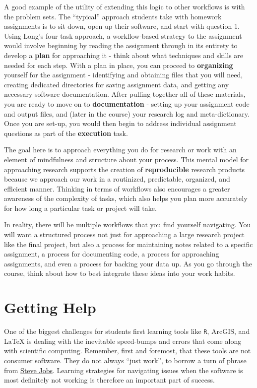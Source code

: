 \documentclass[]{book}
\theoremstyle{definition}
\theoremstyle{definition}
\theoremstyle{definition}
\theoremstyle{remark}
\begin{document}
A good example of the utility of extending this logic to other workflows
is with the problem sets. The ``typical'' approach students take with
homework assignments is to sit down, open up their software, and start
with question 1. Using Long's four task approach, a workflow-based
strategy to the assignment would involve beginning by reading the
assignment through in its entirety to develop a \textbf{plan} for
approaching it - think about what techniques and skills are needed for
each step. With a plan in place, you can proceed to \textbf{organizing}
yourself for the assignment - identifying and obtaining files that you
will need, creating dedicated directories for saving assignment data,
and getting any necessary software documentation. After pulling together
all of these materials, you are ready to move on to
\textbf{documentation} - setting up your assignment code and output
files, and (later in the course) your research log and meta-dictionary.
Once you are set-up, you would then begin to address individual
assignment questions as part of the \textbf{execution} task.

The goal here is to approach everything you do for research or work with
an element of mindfulness and structure about your process. This mental
model for approaching research supports the creation of
\textbf{reproducible} research products because we approach our work in
a routinized, predictable, organized, and efficient manner. Thinking in
terms of workflows also encourages a greater awareness of the complexity
of tasks, which also helps you plan more accurately for how long a
particular task or project will take.

In reality, there will be multiple workflows that you find yourself
navigating. You will want a structured process not just for approaching
a large research project like the final project, but also a process for
maintaining notes related to a specific assignment, a process for
documenting code, a process for approaching assignments, and even a
process for backing your data up. As you go through the course, think
about how to best integrate these ideas into your work habits.

\hypertarget{getting-help}{\chapter{Getting Help}\label{getting-help}}

One of the biggest challenges for students first learning tools like
\texttt{R}, ArcGIS, and LaTeX is dealing with the inevitable speed-bumps
and errors that come along with scientific computing. Remember, first
and foremost, that these tools are not consumer software. They do not
always ``just work'', to borrow a turn of phrase from
\href{https://en.wikipedia.org/wiki/Steve_Jobs}{Steve Jobs}. Learning
strategies for navigating issues when the software is most definitely
not working is therefore an important part of success.
\end{document}
